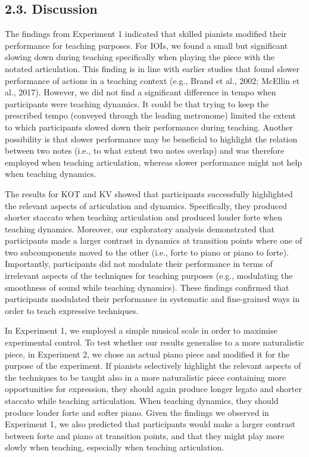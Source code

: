 \documentclass[
  english,
  man,floatsintext]{apa6}
\begin{document}
\hypertarget{discussion}{%
\subsection{2.3. Discussion}\label{discussion}}

The findings from Experiment 1 indicated that skilled pianists modified their performance for teaching purposes. For IOIs, we found a small but significant slowing down during teaching specifically when playing the piece with the notated articulation. This finding is in line with earlier studies that found slower performance of actions in a teaching context (e.g., Brand et al., 2002; McEllin et al., 2017). However, we did not find a significant difference in tempo when participants were teaching dynamics. It could be that trying to keep the prescribed tempo (conveyed through the leading metronome) limited the extent to which participants slowed down their performance during teaching. Another possibility is that slower performance may be beneficial to highlight the relation between two notes (i.e., to what extent two notes overlap) and was therefore employed when teaching articulation, whereas slower performance might not help when teaching dynamics.

The results for KOT and KV showed that participants successfully highlighted the relevant aspects of articulation and dynamics. Specifically, they produced shorter staccato when teaching articulation and produced louder forte when teaching dynamics. Moreover, our exploratory analysis demonstrated that participants made a larger contrast in dynamics at transition points where one of two subcomponents moved to the other (i.e., forte to piano or piano to forte). Importantly, participants did not modulate their performance in terms of irrelevant aspects of the techniques for teaching purposes (e.g., modulating the smoothness of sound while teaching dynamics). These findings confirmed that participants modulated their performance in systematic and fine-grained ways in order to teach expressive techniques.

In Experiment 1, we employed a simple musical scale in order to maximise experimental control. To test whether our results generalise to a more naturalistic piece, in Experiment 2, we chose an actual piano piece and modified it for the purpose of the experiment. If pianists selectively highlight the relevant aspects of the techniques to be taught also in a more naturalistic piece containing more opportunities for expression, they should again produce longer legato and shorter staccato while teaching articulation. When teaching dynamics, they should produce louder forte and softer piano. Given the findings we observed in Experiment 1, we also predicted that participants would make a larger contrast between forte and piano at transition points, and that they might play more slowly when teaching, especially when teaching articulation.
\end{document}
